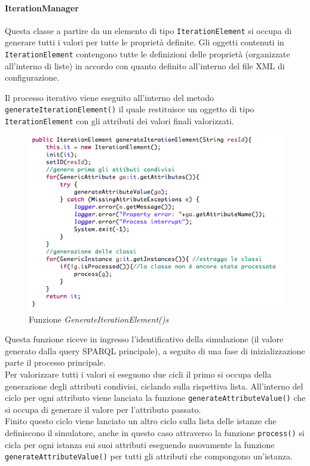 \documentclass[12pt,a4paper,italian]{article}
\begin{document}
	
	\paragraph{IterationManager}
	
	Questa classe a partire da un elemento di tipo \texttt{IterationElement} si occupa di generare tutti i valori per tutte le proprietà definite. Gli oggetti contenuti in \texttt{IterationElement} contengono tutte le definizioni delle proprietà (organizzate all'interno di liste) in accordo con quanto definito all'interno del file XML di configurazione.
	
	Il processo iterativo viene eseguito all'interno del metodo \texttt{generateIterationElement()} il quale restituisce un oggetto di tipo \texttt{IterationElement} con gli attributi dei valori finali valorizzati.
	
		\begin{figure}[h!]
			\centering
			\includegraphics[width=14cm]{img/generateItEl.png}
			\caption{Funzione \emph{GenerateIterationElement()s}}\label{itelgenerator}
		\end{figure}
		
		Questa funzione riceve in ingresso l'identificativo della simulazione (il valore generato dalla query SPARQL  principale), a seguito di una fase di inizializzazione parte il processo principale.\\
		Per valorizzare tutti i valori si eseguono due cicli il primo si occupa della generazione degli attributi condivisi, ciclando sulla rispettiva lista. All'interno del ciclo per ogni attributo viene lanciata la funzione \texttt{generateAttributeValue()} che si occupa di generare il valore per l'attributo passato.\\
		Finito questo ciclo viene lanciato un altro ciclo sulla lista delle istanze che definiscono il simulatore, anche in questo caso attraverso la funzione \texttt{process()} si cicla per ogni istanza sui suoi attributi eseguendo nuovamente la funzione \texttt{generateAttributeValue()} per tutti gli attributi che compongono un'istanza.\\
		
\end{document}
